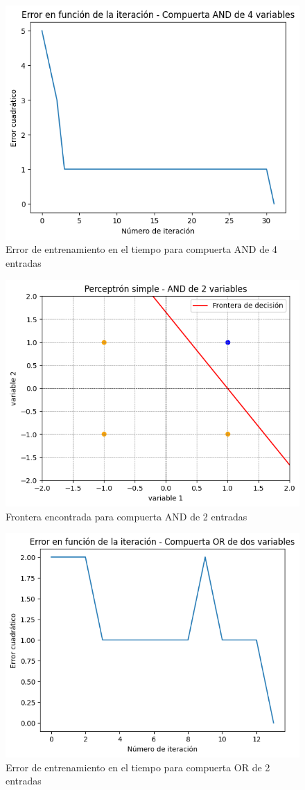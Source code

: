 \documentclass[11pt]{article} %
\begin{document}
\begin{figure}[h!]
	\centering
	\includegraphics[width=0.7\linewidth]{../imgs/ej1/AND4}
	\caption[]{Error de entrenamiento en el tiempo para compuerta AND de 4 entradas}
	\label{fig:and4}
\end{figure}



\begin{figure}[h!]
	\centering
	\includegraphics[width=0.7\linewidth]{../imgs/ej1/ANDFRONT}
	\caption[]{Frontera encontrada para compuerta AND de 2 entradas}
	\label{fig:frontAND}
\end{figure}

\begin{figure}[h!]
	\centering
	\includegraphics[width=0.7\linewidth]{../imgs/ej1/OR2err}
	\caption[]{Error de entrenamiento en el tiempo para compuerta OR de 2 entradas}
	\label{fig:or2err}
\end{figure}
\end{document}
